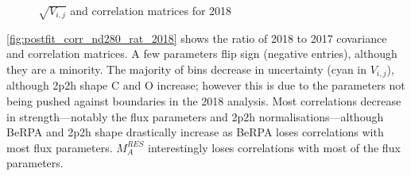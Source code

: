 \begin{figure}[h]
\begin{subfigure}[t]{0.49\textwidth}
		\end{subfigure}
		\caption{$\sqrt{V_{i,j}}$ and correlation matrices for 2018}
		\label{fig:postfit_corr_nd280_2018}
\end{figure}

\autoref{fig:postfit_corr_nd280_rat_2018} shows the ratio of 2018 to 2017 covariance and correlation matrices. A few parameters flip sign (negative entries), although they are a minority. The majority of bins decrease in uncertainty (cyan in $V_{i,j}$), although 2p2h shape C and O increase; however this is due to the parameters not being pushed against boundaries in the 2018 analysis. Most correlations decrease in strength---notably the flux parameters and 2p2h normalisations---although BeRPA and 2p2h shape drastically increase as BeRPA loses correlations with most flux parameters. $M_A^{RES}$ interestingly loses correlations with most of the flux parameters.
